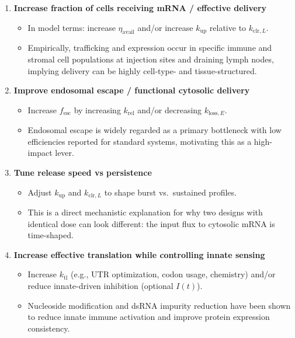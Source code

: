 \begin{enumerate}[label=\arabic*.]
    \item \textbf{Increase fraction of cells receiving mRNA / effective delivery}
    \begin{itemize}
        \item In model terms: increase $\eta_{\mathrm{avail}}$ and/or increase $k_{\mathrm{up}}$ relative to $k_{\mathrm{clr},L}$.
        \item Empirically, trafficking and expression occur in specific immune and stromal cell populations at injection sites and draining lymph nodes, implying delivery can be highly cell-type- and tissue-structured. \parencite{Hassett2024mRNAVaccineTrafficking}
    \end{itemize}

    \item \textbf{Improve endosomal escape / functional cytosolic delivery}
    \begin{itemize}
        \item Increase $f_{\mathrm{esc}}$ by increasing $k_{\mathrm{rel}}$ and/or decreasing $k_{\mathrm{loss},E}$.
        \item Endosomal escape is widely regarded as a primary bottleneck with low efficiencies reported for standard systems, motivating this as a high-impact lever. \parencite{Pei2025EndosomalEscapeLNP}
    \end{itemize}

    \item \textbf{Tune release speed vs persistence}
    \begin{itemize}
        \item Adjust $k_{\mathrm{up}}$ and $k_{\mathrm{clr},L}$ to shape burst vs.~sustained profiles.
        \item This is a direct mechanistic explanation for why two designs with identical dose can look different: the input flux to cytosolic mRNA is time-shaped.
    \end{itemize}

    \item \textbf{Increase effective translation while controlling innate sensing}
    \begin{itemize}
        \item Increase $k_{\mathrm{tl}}$ (e.g., UTR optimization, codon usage, chemistry) and/or reduce innate-driven inhibition (optional $I(t)$).
        \item Nucleoside modification and dsRNA impurity reduction have been shown to reduce innate immune activation and improve protein expression consistency. \parencite{Nelson2020mRNAChemistryInnateImmunity}
    \end{itemize}
\end{enumerate}

